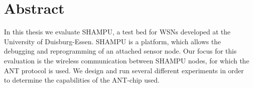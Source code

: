 
\cleardoublepage
\section*{Abstract}

In this thesis we evaluate SHAMPU, a test bed for WSNs developed at the University of Duisburg-Essen. 
SHAMPU is a platform, which allows the debugging and reprogramming of an attached sensor node.
Our focus for this evaluation is the wireless communication between SHAMPU nodes, for which the ANT protocol is used. 
We design and run several different experiments in order to determine the capabilities of the ANT-chip used.

\cleardoublepage
